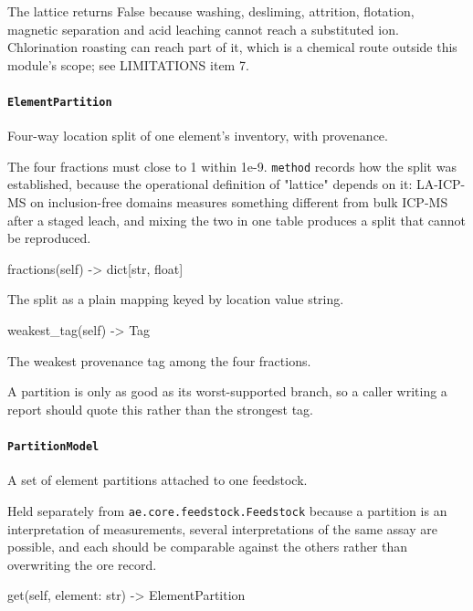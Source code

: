 \documentclass[10pt,a4paper,twoside]{report}
\begin{document}
The lattice returns False because washing, desliming, attrition, flotation, magnetic separation and acid leaching cannot reach a substituted ion. Chlorination roasting can reach part of it, which is a chemical route outside this module's scope; see LIMITATIONS item 7.

\paragraph{\texttt{ElementPartition}}

Four-way location split of one element's inventory, with provenance.

The four fractions must close to 1 within 1e-9. \texttt{method} records how the split was established, because the operational definition of "lattice" depends on it: LA-ICP-MS on inclusion-free domains measures something different from bulk ICP-MS after a staged leach, and mixing the two in one table produces a split that cannot be reproduced.

\begin{verbatimsmall}
fractions(self) -> dict[str, float]
\end{verbatimsmall}

The split as a plain mapping keyed by location value string.

\begin{verbatimsmall}
weakest_tag(self) -> Tag
\end{verbatimsmall}

The weakest provenance tag among the four fractions.

A partition is only as good as its worst-supported branch, so a caller writing a report should quote this rather than the strongest tag.

\paragraph{\texttt{PartitionModel}}

A set of element partitions attached to one feedstock.

Held separately from \texttt{ae.core.feedstock.Feedstock} because a partition is an interpretation of measurements, several interpretations of the same assay are possible, and each should be comparable against the others rather than overwriting the ore record.

\begin{verbatimsmall}
get(self, element: str) -> ElementPartition
\end{verbatimsmall}
\end{document}
